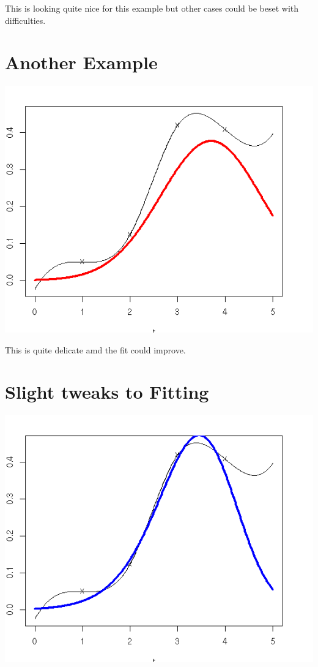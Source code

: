 \documentclass{amsart}
\begin{document}
This is looking quite nice for this example but other cases could be beset with difficulties.

\section{Another Example}

\includegraphics[scale=0.8]{fit2_cfgivt2.png}

This is quite delicate amd the fit could improve.

\section{Slight tweaks to Fitting}

\includegraphics[scale=0.8]{fit3_cfgovt2.png}
\end{document}
